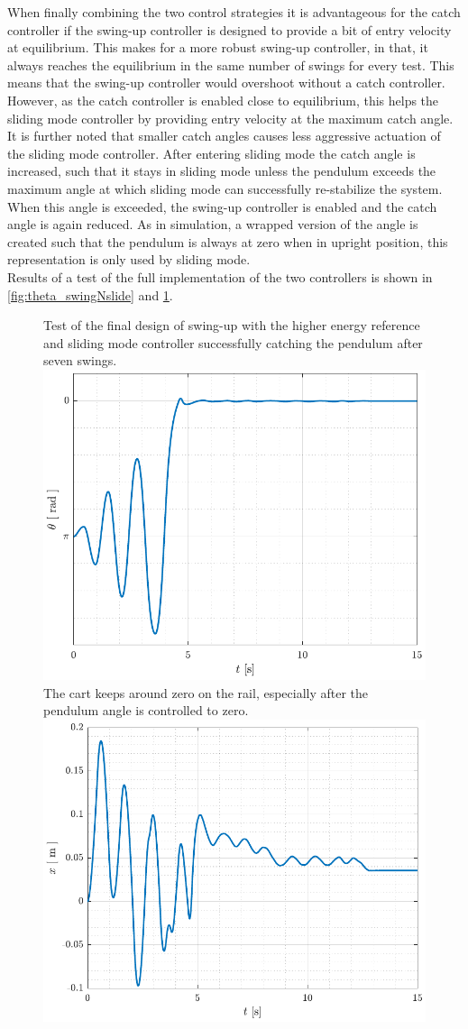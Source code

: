 When finally combining the two control strategies it is advantageous for the catch controller if the swing-up controller is designed to provide a bit of entry velocity at equilibrium. This makes for a more robust swing-up controller, in that, it always reaches the equilibrium in the same number of swings for every test. This means that the swing-up controller would overshoot without a catch controller. However, as the catch controller is enabled close to equilibrium, this helps the sliding mode controller by providing entry velocity at the maximum catch angle.\\
It is further noted that smaller catch angles causes less aggressive actuation of the sliding mode controller. After entering sliding mode the catch angle is increased, such that it stays in sliding mode unless the pendulum exceeds the maximum angle at which sliding mode can successfully re-stabilize the system. When this angle is exceeded, the swing-up controller is enabled and the catch angle is again reduced. As in simulation, a wrapped version of the angle is created such that the pendulum is always at zero when in upright position, this representation is only used by sliding mode.\\
Results of a test of the full implementation of the two controllers is shown in \autoref{fig:theta_swingNslide} and \ref{fig:x_swingNslide}.
%
%
\begin{figure}[H]
  \hspace{1cm}
  \captionbox
  {
    Test of the final design of swing-up with the higher energy reference and sliding mode controller successfully catching the pendulum after seven swings.
    \label{fig:theta_swingNslide}
  }
  {
    \hspace{-1cm}
    \includegraphics[width=.384\textwidth]{figures/theta_swingNslide}
  }
  \hspace{20pt}
  \captionbox 
  {
    The cart keeps around zero on the rail, especially after the pendulum angle is controlled to zero.
    \label{fig:x_swingNslide}
  }
  {
    \hspace{-1cm}
    \includegraphics[width=.4\textwidth]{figures/x_swingNslide}
  }  
\end{figure}
